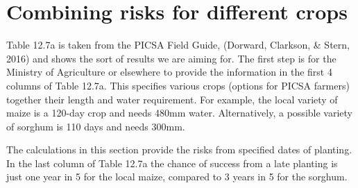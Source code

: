 \documentclass[
  letterpaper,
  DIV=11,
  numbers=noendperiod]{scrreprt}
\begin{document}
\section{Combining risks for different
crops}\label{combining-risks-for-different-crops}

Table 12.7a is taken from the PICSA Field Guide, (Dorward, Clarkson, \&
Stern, 2016) and shows the sort of results we are aiming for. The first
step is for the Ministry of Agriculture or elsewhere to provide the
information in the first 4 columns of Table 12.7a. This specifies
various crops (options for PICSA farmers) together their length and
water requirement. For example, the local variety of maize is a 120-day
crop and needs 480mm water. Alternatively, a possible variety of sorghum
is 110 days and needs 300mm.

The calculations in this section provide the risks from specified dates
of planting. In the last column of Table 12.7a the chance of success
from a late planting is just one year in 5 for the local maize, compared
to 3 years in 5 for the sorghum.
\end{document}
